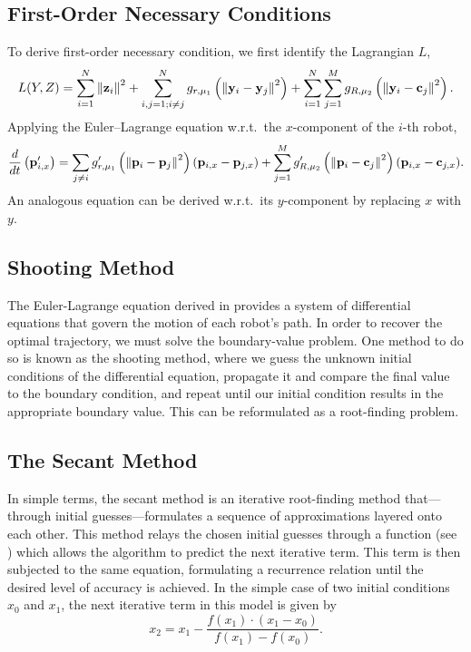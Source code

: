 \documentclass[11pt]{article}
\begin{document}
\subsection{First-Order Necessary Conditions}

To derive first-order necessary condition, we first identify the Lagrangian \(L\),
\begin{equation}
    L(Y,Z) = \sum_{i=1}^{N} \left\lVert \mathbf{z}_i \right\rVert^2 + \sum_{i,j = 1; i \neq j}^{N} g_{r,\mu_1}\left( \left\lVert \mathbf{y}_i - \mathbf{y}_j \right\rVert^2 \right) + \sum_{i=1}^{N} \sum_{j=1}^{M} g_{R,\mu_2}\left( \left\lVert \mathbf{y}_i - \mathbf{c}_j \right\rVert^2 \right).
\end{equation}
Applying the Euler--Lagrange equation w.r.t.\ the \(x\)-component of the \(i\)-th robot,
\begin{equation}
    \frac{d}{dt}\left(\mathbf{p}'_{i,x}\right) = \sum_{j \neq i} g'_{r,\mu_1}\left( \left\lVert \mathbf{p}_i - \mathbf{p}_j \right\rVert^2 \right) (\mathbf{p}_{i,x} - \mathbf{p}_{j,x}) + \sum_{j=1}^{M} g'_{R,\mu_2}\left( \left\lVert \mathbf{p}_i - \mathbf{c}_j \right\rVert^2 \right) (\mathbf{p}_{i,x} - \mathbf{c}_{j,x}).
    \label{eq:EL}
\end{equation}
An analogous equation can be derived w.r.t.\ its \(y\)-component by replacing \(x\) with \(y\).

\subsection{Shooting Method}

The Euler-Lagrange equation derived in  provides a system of differential equations that govern the motion of each robot's path. In order to recover the optimal trajectory, we must solve the boundary-value problem. One method to do so is known as the shooting method, where we guess the unknown initial conditions of the differential equation, propagate it and compare the final value to the boundary condition, and repeat until our initial condition results in the appropriate boundary value. This can be reformulated as a root-finding problem.

\subsection{The Secant Method}

In simple terms, the secant method is an iterative root-finding method that---through initial guesses---formulates a sequence of approximations layered onto each other. This method relays the chosen initial guesses through a function (see ) which allows the algorithm to predict the next iterative term. This term is then subjected to the same equation, formulating a recurrence relation until the desired level of accuracy is achieved. In the simple case of two initial conditions \(x_0\) and \(x_1\), the next iterative term in this model is given by 
\begin{equation}
	x_2 = x_1 - \frac{f(x_1) \cdot (x_1 - x_0)}{f(x_1) - f(x_0)}.
	\label{eq:secant}
\end{equation}
\end{document}

